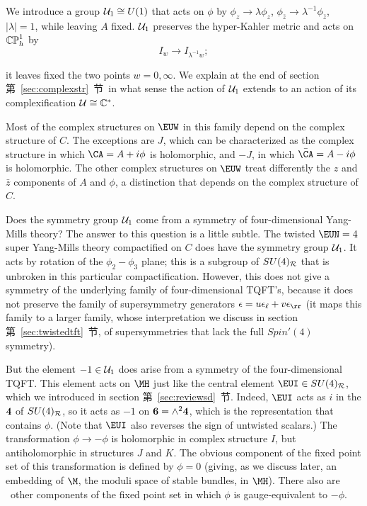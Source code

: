 \def\CU{{\cal U}}
We introduce a group $\CU_1\cong U(1)$ that acts on $\phi$ by
$\phi_z\to \lambda\phi_z$, $\phi_{\bar z}\to
\lambda^{-1}\phi_{\bar z}$, $|\lambda|=1$, while leaving $A$
fixed. $\CU_1$ preserves the hyper-Kahler metric and acts on
$\Bbb{CP}^1_h$ by %
\setcounter{equation}{6}
\begin{equation}\label{eq:zungo}
I_w\to I_{\lambda^{-1}w};
\end{equation}

 it leaves
fixed the two points $w=0,\infty$.  We explain at the end of
section 第~\ref{sec:complexstr}~节\ in what sense the action of $\CU_1$ extends
to an action of its complexification $\CU\cong \Bbb{C}^*$.

Most of the complex structures on $\EUW$ in this family depend on
the complex structure of $C$.  The exceptions are $J$, which can
be characterized as the complex structure in which $\CA=A+i\phi$
is holomorphic, and $-J$, in which $\bar\CA=A-i\phi$ is
holomorphic.  The other complex structures on $ \EUW$ treat
differently the $z$ and $\bar z$ components of $A$ and $\phi$, a
distinction that depends on the complex structure of $C$.

Does the symmetry group ${\cal U}_1$  come from a symmetry of
four-dimensional Yang-Mills theory?  The answer to this question
is a little subtle.  The twisted ${\EUN}=4$ super Yang-Mills
theory compactified on $C$ does have the symmetry group $\CU_1$.
It acts by rotation of the $\phi_2-\phi_3$ plane; this is a
subgroup of $SU(4)_{\cal R}$ that is unbroken in this particular
compactification. However, this does not give a symmetry of the
underlying family of four-dimensional TQFT's, because it does not
preserve the family of supersymmetry generators
$\epsilon=u\epsilon_\ell+v\epsilon_\rr$ (it maps this family to a
larger family, whose interpretation we discuss in section
第~\ref{sec:twistedtft}~节, of supersymmetries that lack the full $Spin'(4)$
symmetry).

But the element $-1\in {\cal U}_1$ does arise from a symmetry of
the four-dimensional TQFT. This element acts on $\MH$ just like
the central element ${\EUI}\in SU(4)_{\cal R}$, which we
introduced in section 第~\ref{sec:reviewsd}~节. Indeed, ${\EUI}$ acts as $i$ in
the ${\bf 4}$ of $SU(4)_{{\cal R}}$, so it acts as $-1$ on ${\bf
6}=\wedge^2{\bf 4}$, which is the representation that contains
$\phi$.  (Note that ${\EUI}$ also reverses the sign of untwisted
scalars.) The transformation $\phi\to-\phi$ is holomorphic in
complex structure $I$, but antiholomorphic in structures $J$ and
$K$.  The obvious component of the fixed point set of this
transformation is defined by $\phi=0$ (giving, as we discuss
later, an embedding of $\M$, the moduli space of stable bundles,
in $\MH$).  There also are \cite{ref20}\ other components of the fixed
point set in which $\phi$ is gauge-equivalent to $-\phi$.

